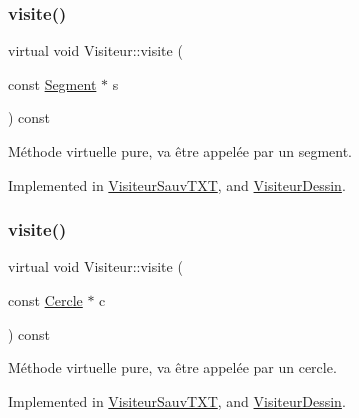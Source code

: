 \subsubsection{\texorpdfstring{visite()}{visite()}\hspace{0.1cm}{\footnotesize\ttfamily [1/5]}}
{\footnotesize\ttfamily virtual void Visiteur\+::visite (\begin{DoxyParamCaption}\item[{const \hyperlink{class_segment}{Segment} $\ast$}]{s }\end{DoxyParamCaption}) const\hspace{0.3cm}{\ttfamily [pure virtual]}}



Méthode virtuelle pure, va être appelée par un segment. 



Implemented in \hyperlink{class_visiteur_sauv_t_x_t_a9c5e3b9172f4ee5aa3af9d936a0f8c73}{Visiteur\+Sauv\+T\+XT}, and \hyperlink{class_visiteur_dessin_a39d12a331fcc80c183fc706cdb2d394a}{Visiteur\+Dessin}.

\mbox{\label{class_visiteur_a0af8611572f009ff37b9429facc7eaec}} 
\subsubsection{\texorpdfstring{visite()}{visite()}\hspace{0.1cm}{\footnotesize\ttfamily [2/5]}}
{\footnotesize\ttfamily virtual void Visiteur\+::visite (\begin{DoxyParamCaption}\item[{const \hyperlink{class_cercle}{Cercle} $\ast$}]{c }\end{DoxyParamCaption}) const\hspace{0.3cm}{\ttfamily [pure virtual]}}



Méthode virtuelle pure, va être appelée par un cercle. 



Implemented in \hyperlink{class_visiteur_sauv_t_x_t_a9e6ae75c4c4cb3f4684895721ac2753f}{Visiteur\+Sauv\+T\+XT}, and \hyperlink{class_visiteur_dessin_ab757769d7c4bf7eac6263eecc8554896}{Visiteur\+Dessin}.

\mbox{\label{class_visiteur_a65332165fada93947fbad9a4d9eebf2c}} 
